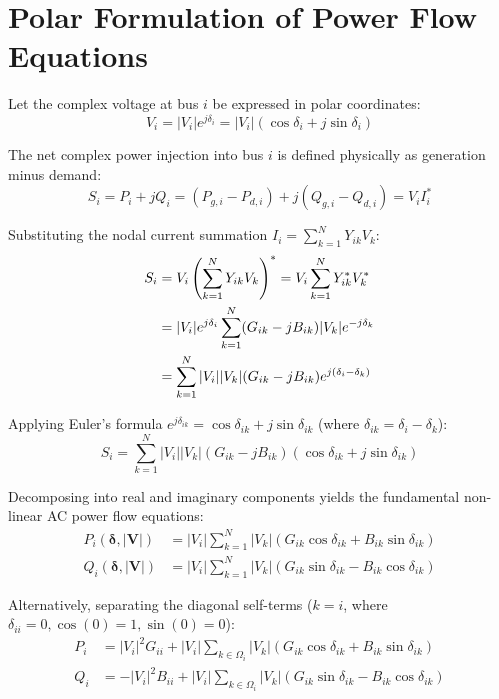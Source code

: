 \documentclass[12pt,a4paper,oneside]{report}
\begin{document}
\section{Polar Formulation of Power Flow Equations}
Let the complex voltage at bus $i$ be expressed in polar coordinates:
\begin{equation}
V_i = |V_i| e^{j \delta_i} = |V_i| (\cos\delta_i + j \sin\delta_i)
\end{equation}

The net complex power injection into bus $i$ is defined physically as generation minus demand:
\begin{equation}
S_i = P_i + j Q_i = (P_{g,i} - P_{d,i}) + j (Q_{g,i} - Q_{d,i}) = V_i I_i^*
\end{equation}

Substituting the nodal current summation $I_i = \sum_{k=1}^N Y_{ik} V_k$:
\begin{align}
S_i &= V_i \left( \sum_{k=1}^N Y_{ik} V_k \right)^* = V_i \sum_{k=1}^N Y_{ik}^* V_k^* \notag \\
&= |V_i| e^{j \delta_i} \sum_{k=1}^N (G_{ik} - j B_{ik}) |V_k| e^{-j \delta_k} \notag \\
&= \sum_{k=1}^N |V_i| |V_k| (G_{ik} - j B_{ik}) e^{j(\delta_i - \delta_k)}
\end{align}

Applying Euler's formula $e^{j\delta_{ik}} = \cos\delta_{ik} + j \sin\delta_{ik}$ (where $\delta_{ik} = \delta_i - \delta_k$):
\begin{equation}
S_i = \sum_{k=1}^N |V_i| |V_k| (G_{ik} - j B_{ik}) (\cos\delta_{ik} + j \sin\delta_{ik})
\end{equation}

Decomposing into real and imaginary components yields the fundamental non-linear AC power flow equations:
\begin{align}
P_i(\boldsymbol{\delta}, |\mathbf{V}|) &= |V_i| \sum_{k=1}^N |V_k| \left( G_{ik} \cos\delta_{ik} + B_{ik} \sin\delta_{ik} \right) \label{eq:calc_P} \\
Q_i(\boldsymbol{\delta}, |\mathbf{V}|) &= |V_i| \sum_{k=1}^N |V_k| \left( G_{ik} \sin\delta_{ik} - B_{ik} \cos\delta_{ik} \right) \label{eq:calc_Q}
\end{align}

Alternatively, separating the diagonal self-terms ($k = i$, where $\delta_{ii} = 0, \cos(0)=1, \sin(0)=0$):
\begin{align}
P_i &= |V_i|^2 G_{ii} + |V_i| \sum_{k \in \Omega_i} |V_k| \left( G_{ik} \cos\delta_{ik} + B_{ik} \sin\delta_{ik} \right) \\
Q_i &= -|V_i|^2 B_{ii} + |V_i| \sum_{k \in \Omega_i} |V_k| \left( G_{ik} \sin\delta_{ik} - B_{ik} \cos\delta_{ik} \right)
\end{align}
\end{document}

